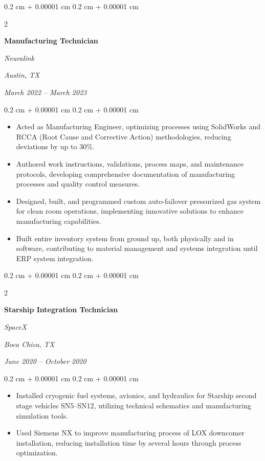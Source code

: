 \documentclass[10pt, letterpaper]{article}
\newenvironment{highlights}{
    \begin{itemize}[
        topsep=0.10 cm,
        parsep=0.10 cm,
        partopsep=0pt,
        itemsep=0pt,
        leftmargin=0.4 cm + 10pt
    ]
}{
    \end{itemize}
} %
\newenvironment{onecolentry}{
    \begin{adjustwidth}{
        0.2 cm + 0.00001 cm
    }{
        0.2 cm + 0.00001 cm
    }
}{
    \end{adjustwidth}
} %
\newenvironment{twocolentry}[2][]{
    \onecolentry
    \def\secondColumn{#2}
    \setcolumnwidth{\fill, 9.0 cm}
    \begin{paracol}{2}
}{
    \switchcolumn \raggedleft \secondColumn
    \end{paracol}
    \endonecolentry
} %
\begin{document}
        \vspace{0.35 cm}

        \begin{twocolentry}{
        \textit{Austin, TX}    
            
        \textit{March 2022 – March 2023}}
            \textbf{Manufacturing Technician}
            
            \textit{Neuralink}
        \end{twocolentry}

        \vspace{0.10 cm}
        \begin{onecolentry}
            \begin{highlights}
                \item Acted as Manufacturing Engineer, optimizing processes using SolidWorks and RCCA (Root Cause and Corrective Action) methodologies, reducing deviations by up to 30\%.
                \item Authored work instructions, validations, process maps, and maintenance protocols, developing comprehensive documentation of manufacturing processes and quality control measures.
                \item Designed, built, and programmed custom auto-failover pressurized gas system for clean room operations, implementing innovative solutions to enhance manufacturing capabilities.
                \item Built entire inventory system from ground up, both physically and in software, contributing to material management and systems integration until ERP system integration.
            \end{highlights}
        \end{onecolentry}

        \vspace{0.35 cm}

        \begin{twocolentry}{
        \textit{Boca Chica, TX}    
            
        \textit{June 2020 – October 2020}}
            \textbf{Starship Integration Technician}
            
            \textit{SpaceX}
        \end{twocolentry}

        \vspace{0.10 cm}
        \begin{onecolentry}
            \begin{highlights}
                \item Installed cryogenic fuel systems, avionics, and hydraulics for Starship second stage vehicles SN5–SN12, utilizing technical schematics and manufacturing simulation tools.
                \item Used Siemens NX to improve manufacturing process of LOX downcomer installation, reducing installation time by several hours through process optimization.
            \end{highlights}
        \end{onecolentry}
\end{document}
